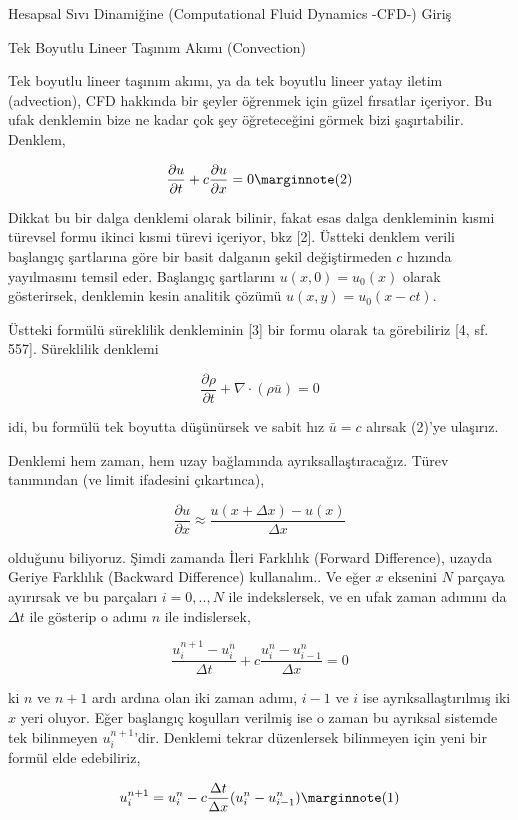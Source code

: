 \documentclass[12pt,fleqn]{article}\usepackage{../../common}
\begin{document}
Hesapsal Sıvı Dinamiğine (Computational Fluid Dynamics -CFD-) Giriş 

Tek Boyutlu Lineer Taşınım Akımı (Convection)

Tek boyutlu lineer taşınım akımı, ya da tek boyutlu lineer yatay iletim
(advection), CFD hakkında bir şeyler öğrenmek için güzel fırsatlar içeriyor. Bu
ufak denklemin bize ne kadar çok şey öğreteceğini görmek bizi
şaşırtabilir. Denklem,

$$
\frac{\partial u}{\partial t} +
c \frac{\partial u}{\partial x}  = 0
\mlabel{2}
$$

Dikkat bu bir dalga denklemi olarak bilinir, fakat esas dalga denkleminin kısmi
türevsel formu ikinci kısmi türevi içeriyor, bkz [2]. Üstteki denklem verili
başlangıç şartlarına göre bir basit dalganın şekil değiştirmeden $c$ hızında
yayılmasını temsil eder. Başlangıç şartlarını $u(x,0) = u_0(x)$ olarak
gösterirsek, denklemin kesin analitik çözümü $u(x,y) = u_0(x-ct)$.

Üstteki formülü süreklilik denkleminin [3] bir formu olarak ta görebiliriz [4, sf. 557].
Süreklilik denklemi

$$
\frac{\partial \rho}{\partial t}  + \nabla \cdot (\rho \bar{u} ) = 0
$$

idi, bu formülü tek boyutta düşünürsek ve sabit hız $\bar{u} = c$ alırsak (2)'ye ulaşırız.

Denklemi hem zaman, hem uzay bağlamında ayrıksallaştıracağız. Türev tanımından
(ve limit ifadesini çıkartınca),

$$
\frac{\partial u}{\partial x} \approx
\frac{u(x+\Delta x) - u(x)}{\Delta x}
$$

olduğunu biliyoruz. Şimdi zamanda İleri Farklılık (Forward Difference), uzayda
Geriye Farklılık (Backward Difference) kullanalım.. Ve eğer $x$ eksenini $N$
parçaya ayırırsak ve bu parçaları $i=0,..,N$ ile indekslersek, ve en ufak zaman
adımını da $\Delta t$ ile gösterip o adımı $n$ ile indislersek,

$$
\frac{u_i^{n+1} - u_i^n}{\Delta t} + c \frac{u_i^{n} - u_{i-1}^n}{\Delta x} = 0
$$

ki $n$ ve $n+1$ ardı ardına olan iki zaman adımı, $i-1$ ve $i$ ise
ayrıksallaştırılmış iki $x$ yeri oluyor. Eğer başlangıç koşulları verilmiş ise o
zaman bu ayrıksal sistemde tek bilinmeyen $u_i^{n+1}$'dir. Denklemi tekrar
düzenlersek bilinmeyen için yeni bir formül elde edebiliriz,

$$
u_i^{n+1} = u_i^n - c \frac{\Delta t}{\Delta x} ( u_i^n - u_{i-1}^n )
\mlabel{1}
$$
\end{document}
